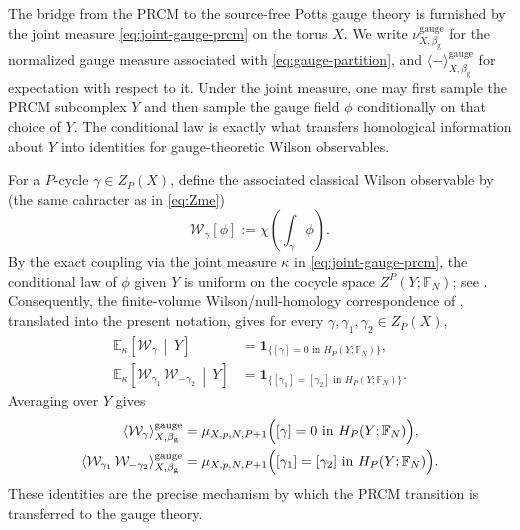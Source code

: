 \documentclass[dvipsnames,a4paper]{article}
\numberwithin{equation}{section}
\theoremstyle{definition}
\theoremstyle{remark}
\begin{document}
The bridge from the PRCM to the source-free Potts gauge theory is furnished by
the joint measure \eqref{eq:joint-gauge-prcm} on the torus \(X\). We write
\(\nu^{\mathrm{gauge}}_{X,\beta_{\mathrm g}}\) for the normalized gauge measure
associated with \eqref{eq:gauge-partition}, and
\(\langle-\rangle^{\mathrm{gauge}}_{X,\beta_{\mathrm g}}\) for expectation with
respect to it. Under the joint measure, one may first sample the PRCM
subcomplex \(Y\) and then sample the gauge field \(\phi\) conditionally on that
choice of \(Y\). The conditional law is exactly what transfers homological
information about \(Y\) into identities for gauge-theoretic Wilson observables.

For a \(P\)-cycle \(\gamma\in Z_P(X)\), define the associated classical Wilson observable by (the same cahracter as in \eqref{eq:Zme})
\begin{equation}
	\mathcal W_\gamma[\phi]
	:=
	\chi\left(\int_\gamma \phi\right).
	\label{eq:classical-Wilson}
\end{equation}
By the exact coupling via the joint measure \(\kappa\) in
\eqref{eq:joint-gauge-prcm}, the conditional law of \(\phi\) given \(Y\) is
uniform on the cocycle space \(Z^P(Y;\mathbb F_N)\); see
\cite[Prop.~21]{DuncanSchweinhartTopological}. Consequently, the finite-volume
Wilson/null-homology correspondence of
\cite[Cor.~29 and Cor.~30]{DuncanSchweinhartTopological}, translated into the
present notation, gives for every \(\gamma,\gamma_1,\gamma_2\in Z_P(X)\),
\begin{align}
	\mathbb E_{\kappa}\!\left[\mathcal W_\gamma \,\middle|\, Y\right]
	&=
	\mathbf 1_{\{
		[\gamma]=0\text{ in }H_P(Y;\mathbb F_N)
		\}},
	\label{eq:toric-conditional-one-point}
	\\
	\mathbb E_{\kappa}\!\left[
	\mathcal W_{\gamma_1}\,\mathcal W_{-\gamma_2}
	\,\middle|\, Y
	\right]
	&=
	\mathbf 1_{\{
		[\gamma_1]=[\gamma_2]\text{ in }H_P(Y;\mathbb F_N)
		\}}.
	\label{eq:toric-conditional-two-point}
\end{align}
Averaging over \(Y\) gives
\begin{align}
	\left\langle \mathcal W_\gamma \right\rangle^{\mathrm{gauge}}_{X,\beta_{\mathrm g}}
	&=
	\mu_{X,p,N,P+1}
	\Bigl(
	[\gamma]=0\text{ in }H_P(Y;\mathbb F_N)
	\Bigr),
	\label{eq:toric-one-point}
	\\
	\left\langle
	\mathcal W_{\gamma_1}\,\mathcal W_{-\gamma_2}
	\right\rangle^{\mathrm{gauge}}_{X,\beta_{\mathrm g}}
	&=
	\mu_{X,p,N,P+1}
	\Bigl(
	[\gamma_1]=[\gamma_2]\text{ in }H_P(Y;\mathbb F_N)
	\Bigr).
	\label{eq:toric-two-point}
\end{align}
These identities are the precise mechanism by which the PRCM transition is
transferred to the gauge theory.
\end{document}
